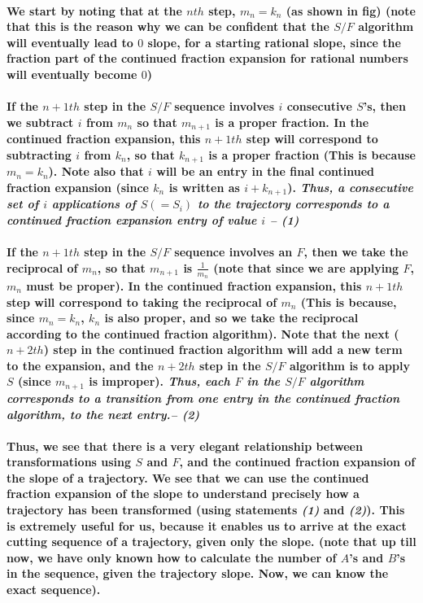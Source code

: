 \documentclass{report}
\begin{document}
\paragraph{We start by noting that at the $nth$ step, $m_n = k_n$ (as shown in fig) (note that this is the reason why we can be confident that the $S/F$ algorithm will eventually lead to $0$ slope, for a starting rational slope, since the fraction part of the continued fraction expansion for rational numbers will eventually become $0$)}

\paragraph{If the $n+1th$ step in the $S/F$ sequence involves $i$ consecutive $S$’s, then we subtract $i$ from $m_n$ so that $m_{n+1}$ is a proper fraction. In the continued fraction expansion, this $n+1th$ step will correspond to subtracting $i$ from $k_n$, so that $k_{n+1}$ is a proper fraction (This is because $m_n = k_n$). Note also that $i$ will be an entry in the final continued fraction expansion (since $k_n$ is written as $i + k_{n+1}$). \textit{Thus, a consecutive set of $i$ applications of $S (= S_i)$ to the trajectory corresponds to a continued fraction expansion entry of value $i$ -- (1)}}

\paragraph{If the $n+1th$ step in the $S/F$ sequence involves an $F$, then we take the reciprocal of $m_n$, so that $m_{n+1}$ is $\frac{1}{m_n}$ (note that since we are applying $F$, $m_n$ must be proper). In the continued fraction expansion, this $n+1th$ step will correspond to taking the reciprocal of $m_n$ (This is because, since $m_n = k_n$, $k_n$ is also proper, and so we take the reciprocal according to the continued fraction algorithm). Note that the next ($n+2th$) step in the continued fraction algorithm will add a new term to the expansion, and the $n+2th$ step in the $S/F$ algorithm is to apply $S$ (since $m_{n+1}$ is improper). \textit{Thus, each $F$ in the $S/F$ algorithm corresponds to a transition from one entry in the continued fraction algorithm, to the next entry.-- (2)}}

\paragraph{Thus, we see that there is a very elegant relationship between transformations using $S$ and $F$, and the continued fraction expansion of the slope of a trajectory. We see that we can use the continued fraction expansion of the slope to understand precisely how a trajectory has been transformed (using statements \textit{(1)} and \textit{(2)}). This is extremely useful for us, because it enables us to arrive at the exact cutting sequence of a trajectory, given only the slope.  (note that up till now, we have only known how to calculate the number of $A$’s and $B$’s in the sequence, given the trajectory slope. Now, we can know the exact sequence).}
\end{document}
